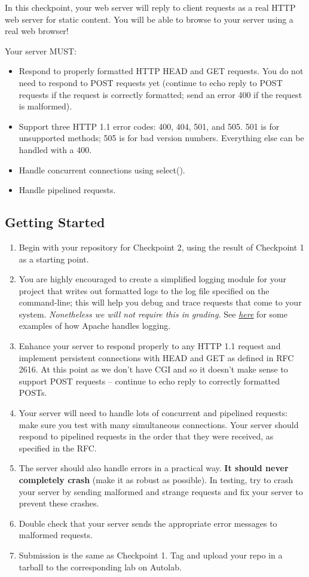 \label{sec:cp2}
In this checkpoint, your web server will reply to client requests as a real HTTP web server for static content. You will be able to browse to your server using a real web browser!

\vspace{5pt}

\noindent Your server MUST:
\begin{itemize}
  \item Respond to properly formatted HTTP HEAD and GET requests. You do not need to respond to POST requests yet (continue to echo reply to POST requests if the request is correctly formatted; send an error 400 if the request is malformed).
    \item Support three HTTP 1.1 error codes: 400, 404, 501, and 505. 501 is for unsupported methods; 505 is for bad version numbers. Everything else can be handled with a 400.
    \item Handle concurrent connections using select().
    \item Handle pipelined requests.
\end{itemize}

\subsection{Getting Started}
\begin{enumerate}
\item Begin with your repository for Checkpoint 2, using the result of Checkpoint 1 as a starting point.
\item You are highly encouraged to create a simplified logging module for your project that writes out formatted logs to the log file specified on the command-line; this will help you debug and trace requests that come to your system. {\it Nonetheless we will not require this in grading.} See \href{https://httpd.apache.org/docs/1.3/logs.html\#common}{\emph{here}} for some examples of how Apache handles logging.
\item Enhance your server to respond properly to any HTTP 1.1 request and implement persistent connections with HEAD and GET as defined in RFC 2616. At this point as we don't have CGI and so it doesn't make sense to support POST requests -- continue to echo reply to correctly formatted POSTs.
\item Your server will need to handle lots of concurrent and pipelined requests: make sure you test with many simultaneous connections. Your server should respond to pipelined requests in the order that they were received, as specified in the RFC.
\item The server should also handle errors in a practical way. {\bf It should never completely crash} (make it as robust as possible). In testing, try to crash your server by sending malformed and strange requests and fix your server to prevent these crashes.
\item Double check that your server sends the appropriate error messages to malformed requests.
\item Submission is the same as Checkpoint 1. Tag and upload your repo in a tarball to the corresponding lab on Autolab.
\end{enumerate}


